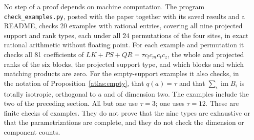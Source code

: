 \documentclass[11pt,letterpaper]{article}
\newcommand{\im}{\operatorname{im}}
\theoremstyle{definition}
\begin{document}
No step of a proof depends on machine computation. The program
\texttt{check\_examples.py}, posted with the paper together with its
saved results and a README, checks 20 examples with rational entries,
covering all nine projected support and rank types, each under all 24
permutations of the four sites, in exact rational arithmetic without
floating point. For each example and permutation it checks all 81
coefficients of \(LK+PS+QR=\tau c_lc_mc_tc_z\), the whole and projected
ranks of the six blocks, the projected support type, and which blocks and
which matching products are zero. For the empty-support examples it also
checks, in the notation of Proposition~\ref{atlas:empty}, that
\(q(a)=\tau\) and that \(\sum_i\im B_i\) is totally isotropic, orthogonal
to \(a\) and of dimension two. The examples include the two of the
preceding section. All but one use \(\tau=3\); one uses \(\tau=12\). These
are finite checks of examples. They do not prove that the nine types are
exhaustive or that the parametrizations are complete, and they do not
check the dimension or component counts.
\end{document}
